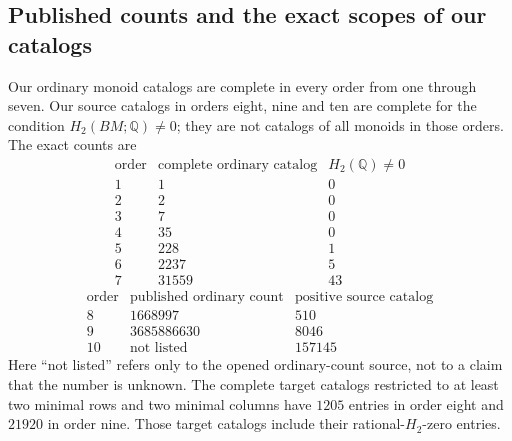 \subsection{Published counts and the exact scopes of our catalogs}

\begin{proposition}
\label{CP2:A-catalog-scope-comparison-through-ten}
Our ordinary monoid catalogs are complete in every order from one
through seven. Our source catalogs in orders eight, nine and ten
are complete for the condition $H_2(BM;\mathbb Q)\ne0$; they are
not catalogs of all monoids in those orders. The exact counts are
\[
\begin{array}{c|r|r}
\text{order}&\text{complete ordinary catalog}&H_2(\mathbb Q)\ne0\\\hline
1&1&0\\
2&2&0\\
3&7&0\\
4&35&0\\
5&228&1\\
6&2237&5\\
7&31559&43
\end{array}
\]
\[
\begin{array}{c|r|r}
\text{order}&\text{published ordinary count}&\text{positive source catalog}\\\hline
8&1668997&510\\
9&3685886630&8046\\
10&\text{not listed}&157145
\end{array}
\]
Here ``not listed'' refers only to the opened ordinary-count source,
not to a claim that the number is unknown. The complete target
catalogs restricted to at least two minimal rows and two minimal
columns have $1205$ entries in order eight and $21920$ in order nine.
Those target catalogs include their rational-$H_2$-zero entries.
\end{proposition}
